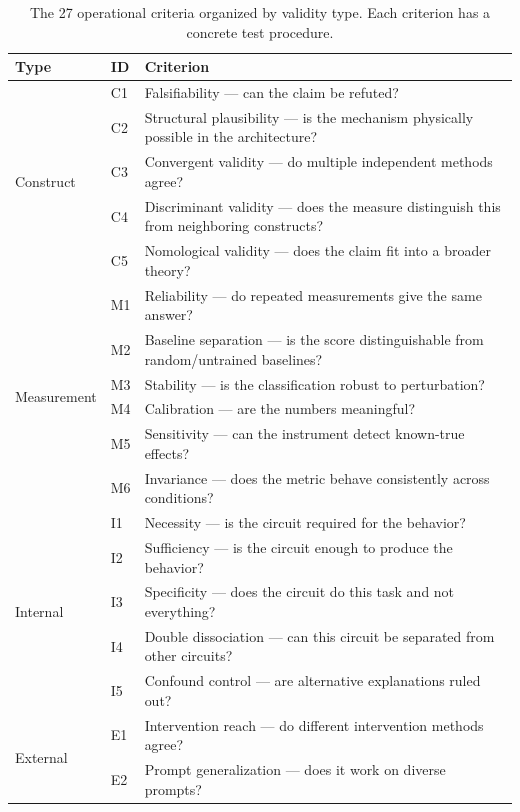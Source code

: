 \documentclass[10pt]{article}
\newcommand{\tighttable}{\setlength{\tabcolsep}{4pt}\renewcommand{\arraystretch}{1.05}}
\begin{document}
\begin{table}[t]
\centering
\tighttable
\caption{The 27 operational criteria organized by validity type. Each criterion has a concrete test procedure.}
\label{tab:criteria}
\small
\begin{tabular}{@{}llp{6.5cm}@{}}
\toprule
\textbf{Type} & \textbf{ID} & \textbf{Criterion} \\
\midrule
\multirow{5}{*}{Construct} & C1 & Falsifiability --- can the claim be refuted? \\
& C2 & Structural plausibility --- is the mechanism physically possible in the architecture? \\
& C3 & Convergent validity --- do multiple independent methods agree? \\
& C4 & Discriminant validity --- does the measure distinguish this from neighboring constructs? \\
& C5 & Nomological validity --- does the claim fit into a broader theory? \\
\midrule
\multirow{6}{*}{Measurement} & M1 & Reliability --- do repeated measurements give the same answer? \\
& M2 & Baseline separation --- is the score distinguishable from random/untrained baselines? \\
& M3 & Stability --- is the classification robust to perturbation? \\
& M4 & Calibration --- are the numbers meaningful? \\
& M5 & Sensitivity --- can the instrument detect known-true effects? \\
& M6 & Invariance --- does the metric behave consistently across conditions? \\
\midrule
\multirow{5}{*}{Internal} & I1 & Necessity --- is the circuit required for the behavior? \\
& I2 & Sufficiency --- is the circuit enough to produce the behavior? \\
& I3 & Specificity --- does the circuit do this task and not everything? \\
& I4 & Double dissociation --- can this circuit be separated from other circuits? \\
& I5 & Confound control --- are alternative explanations ruled out? \\
\midrule
\multirow{6}{*}{External} & E1 & Intervention reach --- do different intervention methods agree? \\
& E2 & Prompt generalization --- does it work on diverse prompts? \\

\end{tabular}
\end{table}
\end{document}
